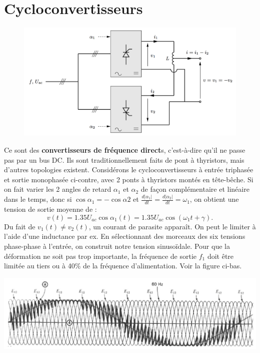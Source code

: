 	\section{Cycloconvertisseurs}
		\begin{figure}
		\vspace{-5mm}
		\includegraphics[scale=0.28]{ch3/14}
		\label{fig:3.14}
		\end{figure}
		Ce sont des \textbf{convertisseurs de fréquence direct}s, c'est-à-dire qu'il ne passe pas par un bus DC. Ils sont traditionnellement faits de pont à thyristors, mais d'autres topologies existent. Considérons le cycloconvertisseurs à entrée triphasée et sortie monophasée ci-contre, avec 2 ponts à thyristors montés en tête-bêche. Si on fait varier les 2 angles de retard $\alpha _1$ et $\alpha _2$ de façon complémentaire et linéaire dans le temps, donc si $\cos \alpha _1 = - \cos \alpha 2$ et $\frac{d|\alpha _1|}{dt} = \frac{d|\alpha _2|}{dt} = \omega _1$, on obtient une tension de sortie moyenne de : 
		\begin{equation}
			v(t) = 1.35 U_{ac} \cos \alpha _1 (t) = 1.35 U_{ac} \cos (\omega _1 t + \gamma). 
		\end{equation}
		Du fait de $v_1(t) \neq v_2(t)$, un courant de parasite apparaît. On peut le limiter à l'aide d'une inductance par ex. En sélectionnant des morceaux des six tensions phase-phase à l'entrée, on construit notre tension sinusoïdale. Pour que la déformation ne soit pas trop importante, la fréquence de sortie $f_1$ doit être limitée au tiers ou à 40\% de la fréquence d'alimentation. Voir la figure ci-bas. 
		
		\begin{center}
			\includegraphics[scale=0.3]{ch3/15}
		\end{center}
